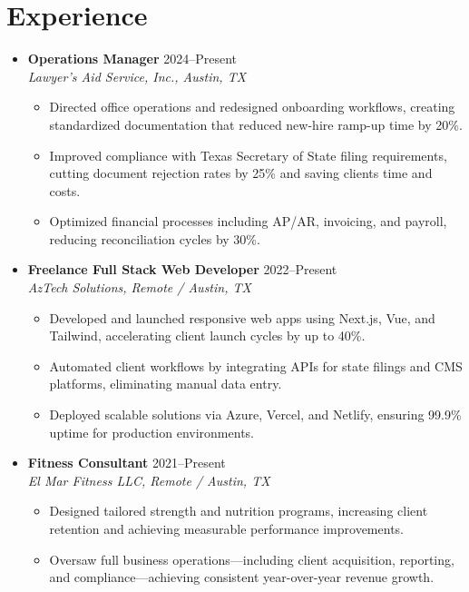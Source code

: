 \documentclass[letterpaper,10pt]{article}
\newcommand{\resumeItem}[1]{\item \small{#1}}
\begin{document}
\section*{Experience}
\begin{itemize}
  \item[]
    \textbf{Operations Manager} \hfill 2024–Present \\
    \textit{Lawyer's Aid Service, Inc., Austin, TX}
    \begin{itemize}[leftmargin=0.15in]
      \resumeItem{Directed office operations and redesigned onboarding workflows, creating standardized documentation that reduced new-hire ramp-up time by 20\%.}
      \resumeItem{Improved compliance with Texas Secretary of State filing requirements, cutting document rejection rates by 25\% and saving clients time and costs.}
      \resumeItem{Optimized financial processes including AP/AR, invoicing, and payroll, reducing reconciliation cycles by 30\%.}
    \end{itemize}

  \item[]
    \textbf{Freelance Full Stack Web Developer} \hfill 2022–Present \\
    \textit{AzTech Solutions, Remote / Austin, TX}
    \begin{itemize}[leftmargin=0.15in]
      \resumeItem{Developed and launched responsive web apps using Next.js, Vue, and Tailwind, accelerating client launch cycles by up to 40\%.}
      \resumeItem{Automated client workflows by integrating APIs for state filings and CMS platforms, eliminating manual data entry.}
      \resumeItem{Deployed scalable solutions via Azure, Vercel, and Netlify, ensuring 99.9\% uptime for production environments.}
    \end{itemize}

  \item[]
    \textbf{Fitness Consultant} \hfill 2021–Present \\
    \textit{El Mar Fitness LLC, Remote / Austin, TX}
    \begin{itemize}[leftmargin=0.15in]
      \resumeItem{Designed tailored strength and nutrition programs, increasing client retention and achieving measurable performance improvements.}
      \resumeItem{Oversaw full business operations—including client acquisition, reporting, and compliance—achieving consistent year-over-year revenue growth.}
    \end{itemize}
\end{itemize}
\end{document}
